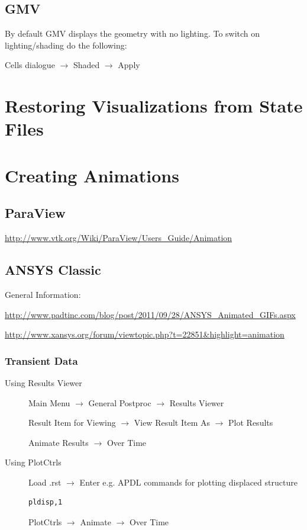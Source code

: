 \subsection{GMV}

By  default  GMV  displays  the  geometry  with  no  lighting.  To  switch  on
lighting/shading do the following:

\noindent Cells dialogue  $\rightarrow$ Shaded $\rightarrow$ Apply

\section{Restoring Visualizations from State Files}


\section{Creating Animations}

\subsection{ParaView}
\url{http://www.vtk.org/Wiki/ParaView/Users_Guide/Animation}

\subsection{ANSYS Classic}

General Information:

\url{http://www.padtinc.com/blog/post/2011/09/28/ANSYS_Animated_GIFs.aspx}

\url{http://www.xansys.org/forum/viewtopic.php?t=22851&highlight=animation}

\subsubsection{Transient Data}

\begin{description}
\item[Using Results Viewer]
Main Menu  $\rightarrow$  General Postproc  $\rightarrow$ Results Viewer 

Result Item for  Viewing $\rightarrow$ View Result Item  As $\rightarrow$ Plot
Results

Animate Results $\rightarrow$ Over Time 

\item[Using PlotCtrls]  Load .rst $\rightarrow$  Enter e.g. APDL  commands for
plotting displaced structure
\begin{verbatim}
pldisp,1
\end{verbatim}

PlotCtrls $\rightarrow$ Animate $\rightarrow$ Over Time
\end{description}

